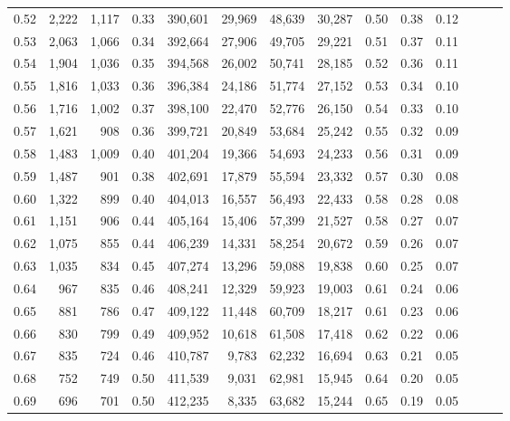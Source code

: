 \begin{tabular}{rrrrrrrrrrrrrr}
0.52 &   2,222 &  1,117 &  0.33 &  390,601 &   29,969 &  48,639 &  30,287 &  0.50 &  0.38 &      0.12 \\
0.53 &   2,063 &  1,066 &  0.34 &  392,664 &   27,906 &  49,705 &  29,221 &  0.51 &  0.37 &      0.11 \\
0.54 &   1,904 &  1,036 &  0.35 &  394,568 &   26,002 &  50,741 &  28,185 &  0.52 &  0.36 &      0.11 \\
0.55 &   1,816 &  1,033 &  0.36 &  396,384 &   24,186 &  51,774 &  27,152 &  0.53 &  0.34 &      0.10 \\
0.56 &   1,716 &  1,002 &  0.37 &  398,100 &   22,470 &  52,776 &  26,150 &  0.54 &  0.33 &      0.10 \\
0.57 &   1,621 &    908 &  0.36 &  399,721 &   20,849 &  53,684 &  25,242 &  0.55 &  0.32 &      0.09 \\
0.58 &   1,483 &  1,009 &  0.40 &  401,204 &   19,366 &  54,693 &  24,233 &  0.56 &  0.31 &      0.09 \\
0.59 &   1,487 &    901 &  0.38 &  402,691 &   17,879 &  55,594 &  23,332 &  0.57 &  0.30 &      0.08 \\
0.60 &   1,322 &    899 &  0.40 &  404,013 &   16,557 &  56,493 &  22,433 &  0.58 &  0.28 &      0.08 \\
0.61 &   1,151 &    906 &  0.44 &  405,164 &   15,406 &  57,399 &  21,527 &  0.58 &  0.27 &      0.07 \\
0.62 &   1,075 &    855 &  0.44 &  406,239 &   14,331 &  58,254 &  20,672 &  0.59 &  0.26 &      0.07 \\
0.63 &   1,035 &    834 &  0.45 &  407,274 &   13,296 &  59,088 &  19,838 &  0.60 &  0.25 &      0.07 \\
0.64 &     967 &    835 &  0.46 &  408,241 &   12,329 &  59,923 &  19,003 &  0.61 &  0.24 &      0.06 \\
0.65 &     881 &    786 &  0.47 &  409,122 &   11,448 &  60,709 &  18,217 &  0.61 &  0.23 &      0.06 \\
0.66 &     830 &    799 &  0.49 &  409,952 &   10,618 &  61,508 &  17,418 &  0.62 &  0.22 &      0.06 \\
0.67 &     835 &    724 &  0.46 &  410,787 &    9,783 &  62,232 &  16,694 &  0.63 &  0.21 &      0.05 \\
0.68 &     752 &    749 &  0.50 &  411,539 &    9,031 &  62,981 &  15,945 &  0.64 &  0.20 &      0.05 \\
0.69 &     696 &    701 &  0.50 &  412,235 &    8,335 &  63,682 &  15,244 &  0.65 &  0.19 &      0.05 \\

\end{tabular}
